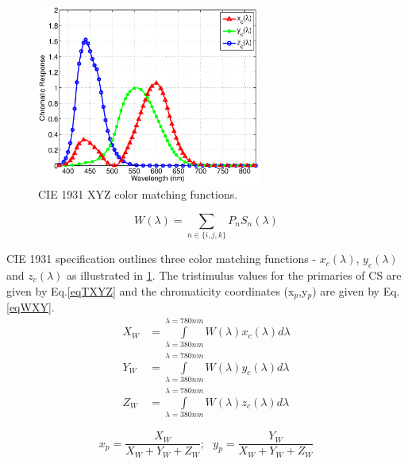 \documentclass[10pt,letterpaper]{article}
\begin{document}
\begin{figure}[b]
	\centering
		\includegraphics[trim={0.05in 0.05in 0.05in 0.05in}, clip=true, width=2.9in]{CIE1931CMF.eps}
	\caption{CIE 1931 XYZ color matching functions.}
	\label{figCIEXYZ}
\end{figure}

\begin{equation}
	W(\lambda) = \sum\limits_{n\in\{i,j,k\}}P_{n}S_{n}(\lambda)
	\label{eqWLDA}
\end{equation}

CIE 1931 specification outlines three color matching functions - $x_{c}(\lambda)$, $y_{c}(\lambda)$ and $z_{c}(\lambda)$ as illustrated in \figurename\ref{figCIEXYZ}. The tristimulus values for the primaries of CS are given by Eq.\eqref{eqTXYZ} and the chromaticity coordinates (x$_{p}$,y$_{p}$) are given by Eq. \eqref{eqWXY}. 
\begin{equation}
	\begin{aligned}
		X_{W} &= \int\limits_{\lambda=380nm}^{\lambda=780nm}W(\lambda)x_{c}(\lambda)d\lambda\\
		Y_{W} &= \int\limits_{\lambda=380nm}^{\lambda=780nm}W(\lambda)y_{c}(\lambda)d\lambda\\
		Z_{W} &= \int\limits_{\lambda=380nm}^{\lambda=780nm}W(\lambda)z_{c}(\lambda)d\lambda
	\end{aligned}
	\label{eqTXYZ}
\end{equation}

\begin{equation}
	x_{p} = \frac{X_{W}}{X_{W}+Y_{W}+Z_{W}}; \text{  } y_{p} = \frac{Y_{W}}{X_{W}+Y_{W}+Z_{W}} %
	\label{eqWXY}
\end{equation}
\end{document}
